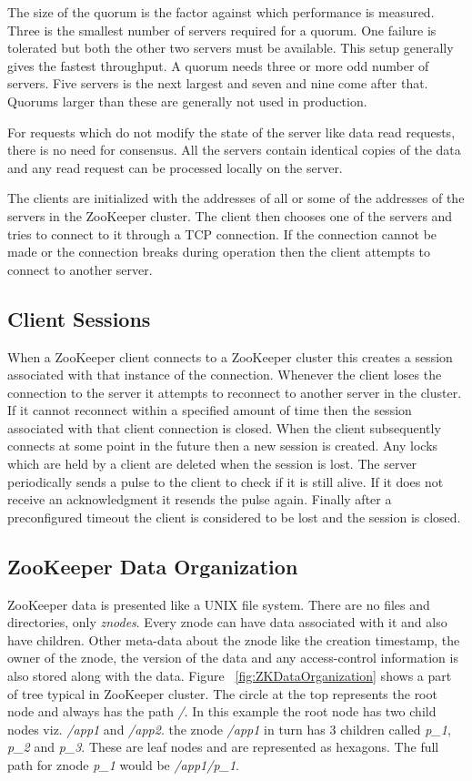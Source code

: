 The size of the quorum is the factor against which performance is measured. Three is the smallest number of servers required for a quorum. One failure is tolerated but both the other two servers must be available. This setup generally gives the fastest throughput. A quorum needs three or more odd number of servers. Five servers is the next largest and seven and nine come after that. Quorums larger than these are generally not used in production.

For requests which do not modify the state of the server like data read requests, there is no need for consensus. All the servers contain identical copies of the data and any read request can be processed locally on the server. 

The clients are initialized with the addresses of all or some of the addresses of the servers in the ZooKeeper cluster. The client then chooses one of the servers and tries to connect to it through a TCP connection. If the connection cannot be made or the connection breaks during operation then the client attempts to connect to another server.

\subsection{Client Sessions}
When a ZooKeeper client connects to a ZooKeeper cluster this creates a session associated with that instance of the connection. Whenever the client loses the connection to the server it attempts to reconnect to another server in the cluster. If it cannot reconnect within a specified amount of time then the session associated with that client connection is closed. When the client subsequently connects at some point in the future then a new session is created. Any locks which are held by a client are deleted when the session is lost. The server periodically sends a pulse to the client to check if it is still alive. If it does not receive an acknowledgment it resends the pulse again. Finally after a preconfigured timeout the client is considered to be lost and the session is closed.

\subsection{ZooKeeper Data Organization}
ZooKeeper data is presented like a UNIX file system. There are no files and directories, only \textit{znodes}. Every znode can have data associated with it and also have children. Other meta-data about the znode like the creation timestamp, the owner of the znode, the version of the data and any access-control information is also stored along with the data. Figure ~\ref{fig:ZKDataOrganization} shows a part of tree typical in ZooKeeper cluster. The circle at the top represents the root node and always has the path \textit{/}. In this example the root node has two child nodes viz. \textit{/app1} and \textit{/app2}. the znode \textit{/app1} in turn has 3 children called \textit{p\_1}, \textit{p\_2} and \textit{p\_3}. These are leaf nodes and are represented as hexagons. The full path for znode \textit{p\_1} would be \textit{/app1/p\_1}.

